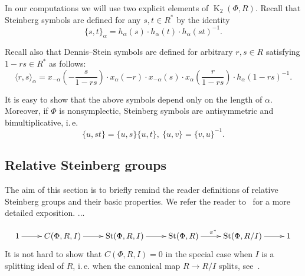 \documentclass[oneside, 10pt]{amsart}
\theoremstyle{remark}
\theoremstyle{definition}
\DeclareMathOperator{\St}{St}
\DeclareMathOperator{\K}{K}
\numberwithin{equation}{section}
\begin{document}
In our computations we will use two explicit elements of $\K_2(\Phi, R)$. Recall that Steinberg symbols are defined for any $s, t \in R^*$ by the identity
\[ \{ s, t \}_\alpha = h_\alpha(s) \cdot h_\alpha(t) \cdot h_\alpha(st)^{-1}. \]

Recall also that Dennis--Stein symbols are defined for arbitrary $r, s\in R$ satisfying $1 - rs \in R^*$ as follows:
\begin{equation} \label{eq:dennis-stein}
 \langle r,s \rangle _ \alpha = x_{-\alpha}\left(-\frac{s}{1 - rs}\right) \cdot x_{\alpha}(-r) \cdot x_{-\alpha}(s) \cdot x_{\alpha}\left(\frac{r}{1-rs}\right) \cdot h_{\alpha}(1 - rs)^{-1}.
\end{equation} 

It is easy to show that the above symbols depend only on the length of $\alpha$.
Moreover, if $\Phi$ is nonsymplectic, Steinberg symbols are antisymmetric and bimultiplicative, i.\,e. \begin{equation} \label{eq:symbol-properties} \{ u, st \} = \{ u, s\} \{ u, t \}, \ \{ u, v \} = \{ v, u\}^{-1}. \end{equation}

\subsection{Relative Steinberg groups}

The aim of this section is to briefly remind the reader definitions of relative Steinberg groups and their basic properties. We refer the reader to~\cite[Section~3]{S15} for a more detailed exposition.
...

\begin{equation}\label{eq:relative-St}
 \xymatrix{ 1 \ar[r] & C(\Phi, R, I) \ar[r] & \St(\Phi, R, I) \ar[r] & \St(\Phi, R) \ar[r]^{\pi^*} & \St(\Phi, R/I) \ar[r] & 1 }
\end{equation}
It is not hard to show that $C(\Phi, R, I) = 0$ in the special case when $I$ is a splitting ideal of $R$, i.\,e. when the canonical map $R \to R/I$ splits, see~\cite[Lemma~8]{S15}. 
\end{document}
